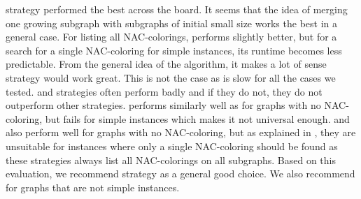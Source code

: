 \MergeLinear{} strategy performed the best across the board.
It seems that the idea of merging one growing subgraph
with subgraphs of initial small size works the best
in a general case.
%
For listing all NAC-colorings, \SharedVertices{} performs
slightly better, but for a search for a single NAC-coloring for simple instances,
its runtime becomes less predictable.
%
From the general idea of the \Subgraphs{} algorithm,
it makes a lot of sense \Log{} strategy would work great.
This is not the case as \Log{} is slow for all the cases we tested.
%
\MinMax{} and \SortedBits{} strategies often perform badly
and if they do not, they do not outperform other strategies.
%
\PromisingCycles{} performs similarly well as \Neighbors{}
for graphs with no NAC-coloring,
but fails for simple instances which makes it not universal enough.
%
\SortedSize{} and \Score{} also perform well for graphs with no NAC-coloring,
but as explained in ,
they are unsuitable for instances where only a single NAC-coloring
should be found as these strategies always list all NAC-colorings
on all subgraphs.
%
Based on this evaluation, we recommend strategy \MergeLinear{} as a general good choice.
We also recommend \SharedVertices{} for graphs that are not simple instances.

